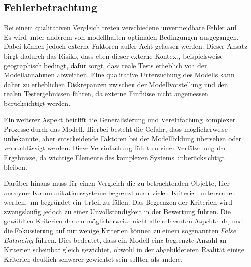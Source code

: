 \subsection{Fehlerbetrachtung}

Bei einem qualitativen Vergleich treten verschiedene unvermeidbare Fehler auf. Es wird unter anderem von modellhaften optimalen Bedingungen ausgegangen. Dabei können jedoch externe Faktoren außer Acht gelassen werden. Dieser Ansatz birgt dadurch das Risiko, dass eben dieser externe Kontext, beispielsweise geographisch bedingt, dafür sorgt, dass reale Tests erheblich von den Modellannahmen abweichen. Eine qualitative Untersuchung des Modells kann daher zu erheblichen Diskrepanzen zwischen der Modellvorstellung und den realen Testergebnissen führen, da externe Einflüsse nicht angemessen berücksichtigt werden.

Ein weiterer Aspekt betrifft die Generalisierung und Vereinfachung komplexer Prozesse durch das Modell. Hierbei besteht die Gefahr, dass möglicherweise unbekannte, aber entscheidende Faktoren bei der Modellbildung übersehen oder vernachlässigt werden. Diese Vereinfachung führt zu einer Verfälschung der Ergebnisse, da wichtige Elemente des komplexen Systems unberücksichtigt bleiben\cite{DisadvantagesOfQualitativApproaches}.

Darüber hinaus muss für einen Vergleich die zu betrachtenden Objekte, hier anonyme Kommunikationssysteme begrenzt nach vielen Kriterien untersuchen werden, um begründet ein Urteil zu fällen. Das Begrenzen der Kriterien wird zwangsläufig jedoch zu einer Unvollständigkeit in der Bewertung führen. Die gewählten Kriterien decken möglicherweise nicht alle relevanten Aspekte ab, und die Fokussierung auf nur wenige Kriterien können zu einem sogenannten \textit{False Balancing} führen. Dies bedeutet, dass ein Modell eine begrenzte Anzahl an Kriterien scheinbar gleich gewichtet, obwohl in der abgebildeteten Realität einige Kriterien deutlich schwerer gewichtet sein sollten als andere.